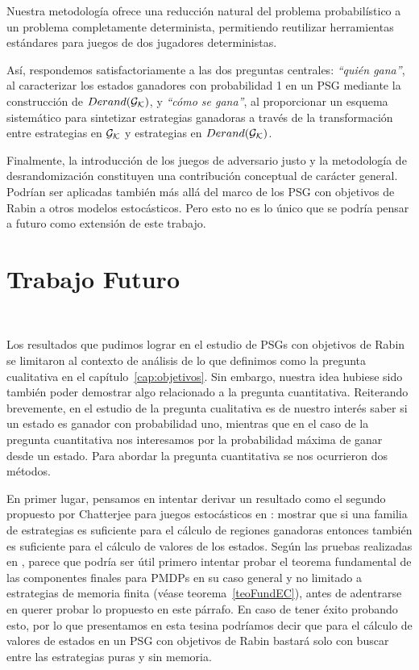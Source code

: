 Nuestra metodología ofrece una reducción natural del problema probabilístico a
un problema completamente determinista, permitiendo reutilizar herramientas
estándares para juegos de dos jugadores deterministas.

Así, respondemos satisfactoriamente a las dos preguntas centrales:
\textit{“quién gana”}, al caracterizar los estados ganadores con probabilidad 1
en un PSG mediante la construcción de $Derand(\mathcal{G}_{\mathcal{K}})$, y \textit{“cómo se gana”}, al
proporcionar un esquema sistemático para sintetizar estrategias ganadoras a
través de la transformación entre estrategias en $\mathcal{G}_{\mathcal{K}}$ y estrategias en $Derand(\mathcal{G}_{\mathcal{K}})$.

Finalmente, la introducción de los juegos de adversario justo y la metodología
de desrandomización constituyen una contribución conceptual de carácter
general. Podrían ser aplicadas también más allá del marco de los PSG con
objetivos de Rabin a otros modelos estocásticos. Pero esto no es lo único que
se podría pensar a futuro como extensión de este trabajo.


\section{Trabajo Futuro}
~\label{cap:conclusions:sec:future}

Los resultados que pudimos lograr en el estudio de PSGs con objetivos de Rabin
se limitaron al contexto de análisis de lo que definimos como la pregunta
cualitativa en el capítulo~\ref{cap:objetivos}. Sin embargo, nuestra idea
hubiese sido también poder demostrar algo relacionado a la pregunta
cuantitativa. Reiterando brevemente, en el estudio de la pregunta cualitativa
es de nuestro interés saber si un estado es ganador con probabilidad uno,
mientras que en el caso de la pregunta cuantitativa nos interesamos por la
probabilidad máxima de ganar desde un estado. Para abordar la pregunta
cuantitativa se nos ocurrieron dos métodos.

En primer lugar, pensamos en intentar derivar un resultado como el segundo
propuesto por Chatterjee para juegos estocásticos en \cite{ComplexityRabin}:
mostrar que si una familia de estrategias es suficiente para el cálculo de
regiones ganadoras entonces también es suficiente para el cálculo de valores de
los estados. Según las pruebas realizadas en \cite{ComplexityRabin}, parece que
podría ser útil primero intentar probar el teorema fundamental de las
componentes finales para PMDPs en su caso general y no limitado a estrategias
de memoria finita (véase teorema~\ref{teoFundEC}), antes de adentrarse en
querer probar lo propuesto en este párrafo. En caso de tener éxito probando
esto, por lo que presentamos en esta tesina podríamos decir que para el cálculo
de valores de estados en un PSG con objetivos de Rabin bastará solo con buscar
entre las estrategias puras y sin memoria.

